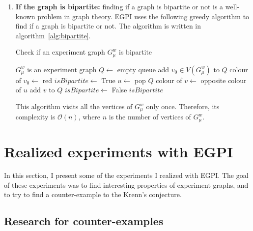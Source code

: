 \begin{enumerate}
    \item \textbf{If the graph is bipartite:} finding if a graph is bipartite or not is a well-known problem in graph theory.
        EGPI uses the following greedy algorithm to find if a graph is bipartite or not.
        The algorithm is written in algorithm~\ref{alg:bipartite}.
        \begin{algorithm}
            \caption{Check if an experiment graph $G_\mu^w$ is bipartite}
            \label{alg:bipartite}
            \begin{algorithmic}
                \Require $G_\mu^w$ is an experiment graph
                \State $Q \gets$ empty queue
                \State add $v_0 \in V(G_\mu^w)$ to $Q$
                \State colour of $v_0 \gets$ red
                \State $isBipartite \gets$ True
                    \State $u \gets$ pop $Q$
                            \State colour of $v \gets$ opposite colour of $u$
                            \State add $v$ to $Q$
                            \State $isBipartite \gets$ False
                        \EndIf
                    \EndFor
                \EndWhile
                \State \Return $isBipartite$
            \end{algorithmic}
        \end{algorithm}

        This algorithm visits all the vertices of $G_\mu^w$ only once.
        Therefore, its complexity is $\mathcal{O}(n)$, where $n$ is the number of vertices of $G_\mu^w$.

\end{enumerate}


\section{Realized experiments with EGPI}
\label{sec:realized_experiments}

In this section, I present some of the experiments I realized with EGPI. The goal of these experiments was to find interesting properties of experiment graphs, and to try to find a counter-example to the Krenn's conjecture.\\

\subsection{Research for counter-examples}
\label{subsec:research-for-counter-examples}

